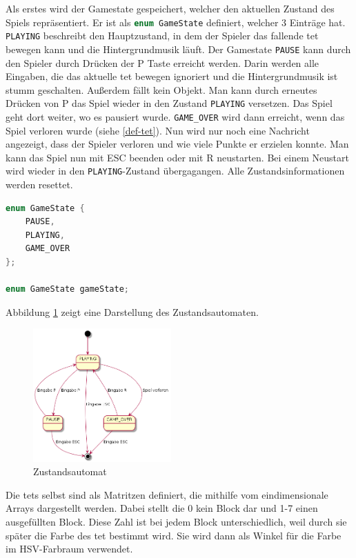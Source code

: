 \documentclass[11pt]{article}
\newcommand{\lstin}[1]{\lstinline[language=C]{#1}}
\newcommand{\refabb}[1]{Abbildung \ref{#1}}
\begin{document}
Als erstes wird der Gamestate gespeichert, welcher den aktuellen Zustand des Spiels repräsentiert.
Er ist als \lstin{enum GameState} definiert, welcher 3 Einträge hat. 
\lstin{PLAYING} beschreibt den Hauptzustand, in dem der Spieler das fallende \gls{tet} bewegen kann und die Hintergrundmusik läuft.
Der Gamestate \lstin{PAUSE} kann durch den Spieler durch Drücken der P Taste erreicht werden. 
Darin werden alle Eingaben, die das aktuelle \gls{tet} bewegen ignoriert und die Hintergrundmusik ist stumm geschalten. Außerdem fällt kein Objekt.
Man kann durch erneutes Drücken von P das Spiel wieder in den Zustand \lstin{PLAYING} versetzen. Das Spiel geht dort weiter, wo es pausiert wurde.
\lstin{GAME_OVER} wird dann erreicht, wenn das Spiel verloren wurde (siehe \ref{def-tet}). 
Nun wird nur noch eine Nachricht angezeigt, dass der Spieler verloren und wie viele Punkte er erzielen konnte. Man kann das Spiel nun mit ESC beenden oder mit R neustarten.
Bei einem Neustart wird wieder in den \lstin{PLAYING}-Zustand übergagangen. Alle Zustandsinformationen werden resettet.

\begin{lstlisting}[language=C]
enum GameState {
    PAUSE,
    PLAYING,
    GAME_OVER
};

enum GameState gameState;
\end{lstlisting}

\refabb{state} zeigt eine Darstellung des Zustandsautomaten.

\begin{figure}[h]
  \centering
  \includegraphics[width=200px]{../state.png}
  \caption{Zustandsautomat}
  \label{state}
\end{figure}

Die \glspl{tet} selbst sind als Matritzen definiert, die mithilfe vom eindimensionale Arrays dargestellt werden. Dabei stellt die 0 kein Block dar und 1-7 einen ausgefüllten Block.
Diese Zahl ist bei jedem Block unterschiedlich, weil durch sie später die Farbe des \gls{tet} bestimmt wird. Sie wird dann als Winkel für die Farbe im HSV-Farbraum verwendet.
\end{document}
